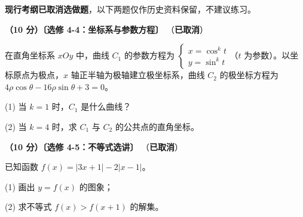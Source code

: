 \begin{gktip}
\textbf{ 现行考纲已取消选做题}，以下两题仅作历史资料保留，不建议练习。
\end{gktip}

\begin{question}
\textbf{（10 分）〔选修 4-4：坐标系与参数方程〕} （\textbf{已取消}）

在直角坐标系 $xOy$ 中，曲线 $C_1$ 的参数方程为 $\begin{cases}x=\cos^{k}t\\ y=\sin^{k}t\end{cases}$（$t$ 为参数）。以坐标原点为极点，$x$ 轴正半轴为极轴建立极坐标系，曲线 $C_2$ 的极坐标方程为 $4\rho\cos\theta-16\rho\sin\theta+3=0$。

  (1) 当 $k=1$ 时，$C_1$ 是什么曲线？

  (2) 当 $k=4$ 时，求 $C_1$ 与 $C_2$ 的公共点的直角坐标。

\end{question}
\begin{question}
\textbf{（10 分）〔选修 4-5：不等式选讲〕} （\textbf{已取消}）

已知函数 $f(x)=|3x+1|-2|x-1|$。

  (1) 画出 $y=f(x)$ 的图象；

  (2) 求不等式 $f(x)>f(x+1)$ 的解集。

\par\medskip


\end{question}